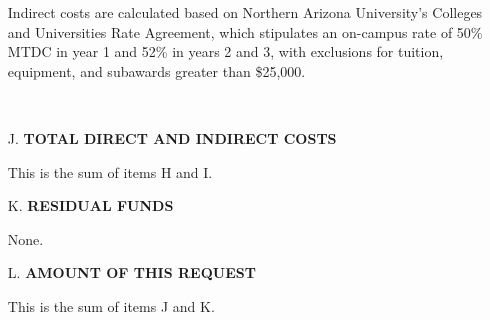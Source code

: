 \documentclass[11pt]{article}
\begin{document}
\begin{enumerate}[leftmargin=*]
Indirect costs are calculated based on Northern Arizona University's Colleges and Universities Rate Agreement, which stipulates an on-campus rate of 50\% MTDC in year 1 and 52\% in years 2 and 3, with exclusions for tuition, equipment, and subawards greater than \$25,000.

\ \hfill {}

\item[J.] \textbf{TOTAL DIRECT AND INDIRECT COSTS}

This is the sum of items H and I. \hfill {}

\item[K.] \textbf{RESIDUAL FUNDS}

None. \hfill {}

\item[L.] \textbf{AMOUNT OF THIS REQUEST}

This is the sum of items J and K. \hfill {}

\end{enumerate}
\end{document}
